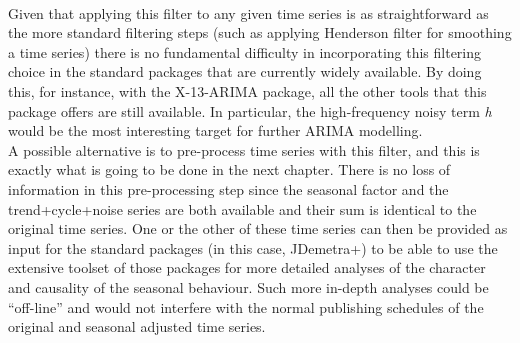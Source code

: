 \documentclass{article}
\begin{document}
\\Given that applying this filter to any given time series is as straightforward as the more standard filtering steps (such as applying Henderson filter for smoothing a time series) there is no fundamental difficulty in incorporating this filtering choice in the standard packages that are currently widely available. By doing this, for instance, with the X-13-ARIMA package, all the other tools that this package offers are still available. In particular, the high-frequency noisy term \textit{h} would be the most interesting target for further ARIMA modelling. \\A possible alternative is to pre-process time series with this filter, and this is exactly what is going to be done in the next chapter. There is no loss of information in this pre-processing step since the seasonal factor and the trend+cycle+noise series are both available and their sum is identical to the original time series. One or the other of these time series can then be provided as input for the standard packages (in this case, JDemetra+) to be able to use the extensive toolset of those packages for more detailed analyses of the character and causality of the seasonal behaviour. Such more in-depth analyses could be ``off-line'' and would not interfere with the normal publishing schedules of the original and seasonal adjusted time series. 
\end{document}
